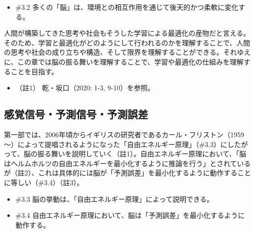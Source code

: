 \begin{note}{}
  \begin{itemize}
    \tightlist
    \item{\#3.2}
        多くの「脳」は、環境との相互作用を通じて後天的かつ柔軟に変化する。
  \end{itemize}
\end{note}

人間が構築してきた思考や社会もそうした学習による最適化の産物だと言える。そのため、学習と最適化がどのようにして行われるのかを理解することで、人間の思考や社会の成り立ちや構造、そして限界を理解することができる。それゆえに、この章では脳の振る舞いを理解することで、学習や最適化の仕組みを理解することを目指す。

\begin{itemize}
\tightlist
\item
  （註1） 乾・坂口（2020: 1-3, 9-10）\cite{InuiAndSakaguchi}を参照。
\end{itemize}

\subsection{感覚信号・予測信号・予測誤差}\label{ux611fux899aux4fe1ux53f7ux4e88ux6e2cux4fe1ux53f7ux4e88ux6e2cux8aa4ux5dee}

第一部では、2006年頃からイギリスの研究者であるカール・フリストン（1959～）によって提唱されるようになった「\mbox{自由エネルギー原理}」（\#3.3）にしたがって、脳の振る舞いを説明していく（註1）。\mbox{自由エネルギー原理}において、「脳はヘルムホルツの自由エネルギーを最小化するように推論を行う」とされているが（註2）、これは具体的には脳が「\mbox{予測誤差}」を最小化するように動作することに等しい（\#3.4）（註3）。

\begin{note}{}
  \begin{itemize}
    \tightlist
    \item{\#3.3}
      脳の挙動は、「\mbox{自由エネルギー原理}」によって説明できる。
    \item{\#3.4}
      \mbox{自由エネルギー原理}において、脳は「\mbox{予測誤差}」を最小化するように動作する。
  \end{itemize}
\end{note}

